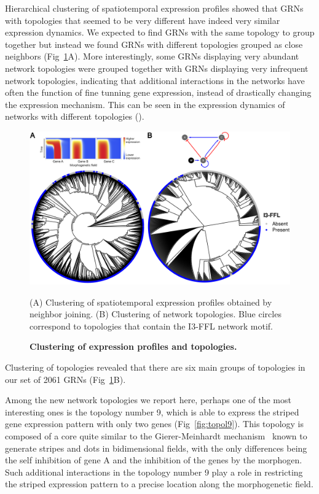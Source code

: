 \documentclass[10pt,letterpaper]{article}
\begin{document}
Hierarchical clustering of spatiotemporal expression profiles showed that GRNs
with topologies that seemed to be very different have indeed very similar
expression dynamics. We expected to find GRNs with the same topology to group
together but instead we found GRNs with different topologies grouped as close
neighbors (Fig~\ref{fig:clustering}A). More interestingly, some GRNs displaying
very abundant network topologies were grouped together with GRNs displaying
very infrequent network topologies, indicating that additional interactions
in the networks have often the function of fine tunning gene expression, instead
of drastically changing the expression mechanism. This can be seen in the
expression dynamics of networks with different topologies ().

\begin{figure}[!h]
 \includegraphics[width=\textwidth]{figures/results/Fig7}
 \caption{\bf Clustering of expression profiles and topologies.}
 (A) Clustering of spatiotemporal expression profiles obtained by
 neighbor joining. (B) Clustering of network topologies. Blue circles
 correspond to topologies that contain the I3-FFL network motif.
 \label{fig:clustering}
\end{figure}

Clustering of topologies revealed that there are six main groups of topologies
in our set of 2061 GRNs (Fig~\ref{fig:clustering}B).

Among the new network topologies we report here, perhaps one of the most
interesting ones is the topology number 9, which is able to express the striped
gene expression pattern with only two genes (Fig~\ref{fig:topol9}).
This topology is composed of a core quite similar to the Gierer-Meinhardt
mechanism~\cite{giererMeinh1972, meinhardt2000} known to generate
stripes and dots in bidimensional fields, with the only differences being
the self inhibition of gene A and the inhibition of the genes by the morphogen.
Such additional interactions in the topology number 9 play a role in restricting
the striped expression pattern to a precise location along the morphogenetic field.
\end{document}
